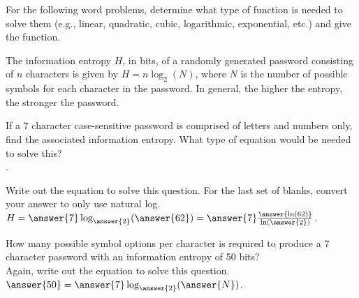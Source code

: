 \documentclass{ximera}
\author{Elizabeth Campolongo}
\begin{document}
\begin{exercise}
For the following word problems, determine what type of function is needed to solve them (e.g., linear, quadratic, cubic, logarithmic, exponential, etc.) and give the function. 
%


The information entropy $H$, in bits, of a randomly generated password consisting
of $n$ characters is given by $H = n\log_2(N)$, where $N$ is the number of possible symbols for each
character in the password. In general, the higher the entropy, the stronger the password.

If a 7 character case-sensitive password is comprised of letters and numbers only, find the
associated information entropy.
What type of equation would be needed to solve this?\\
.
\begin{exercise}
Write out the equation to solve this question. For the last set of blanks, convert your answer to only use natural log.\\
$H = \answer{7}\log_{\answer{2}}(\answer{62}) = \answer{7}\frac{\answer{\ln(62)}}{\ln(\answer{2})}$.

\begin{exercise}
How many possible symbol options per character is required to produce a 7 character password
with an information entropy of 50 bits?\\
Again, write out the equation to solve this question.\\
$\answer{50} = \answer{7}\log_{\answer{2}}(\answer{N})$.
\end{exercise}
\end{exercise}


\end{exercise}
\end{document}
